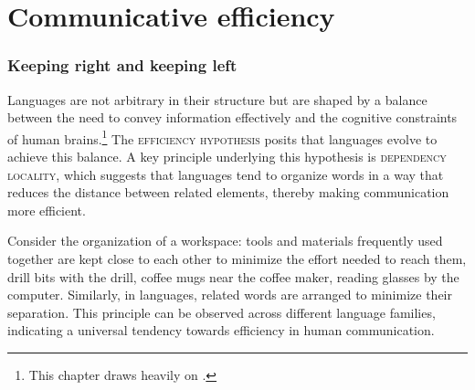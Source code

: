 \chapter{Communicative efficiency}




\subsection{Keeping right and keeping left}

Languages are not arbitrary in their structure but are shaped by a balance between the need to convey information effectively and the cognitive constraints of human brains.\footnote{This chapter draws heavily on \citet{Futrell2020}.} The \textsc{efficiency hypothesis} posits that languages evolve to achieve this balance. A key principle underlying this hypothesis is \textsc{dependency locality}, which suggests that languages tend to organize words in a way that reduces the distance between related elements, thereby making communication more efficient.

Consider the organization of a workspace: tools and materials frequently used together are kept close to each other to minimize the effort needed to reach them, drill bits with the drill, coffee mugs near the coffee maker, reading glasses by the computer. Similarly, in languages, related words are arranged to minimize their separation. This principle can be observed across different language families, indicating a universal tendency towards efficiency in human communication.

